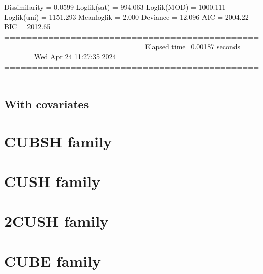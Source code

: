 \documentclass[letterpaper,10pt,english]{sphinxmanual}
\begin{document}
\begin{sphinxVerbatim}[commandchars=\\\{\}]
Dissimilarity = 0.0599
Loglik(sat)   = \PYGZhy{}994.063
Loglik(MOD)   = \PYGZhy{}1000.111
Loglik(uni)   = \PYGZhy{}1151.293
Mean\PYGZhy{}loglik   = \PYGZhy{}2.000
Deviance      = 12.096
\PYGZhy{}\PYGZhy{}\PYGZhy{}\PYGZhy{}\PYGZhy{}\PYGZhy{}\PYGZhy{}\PYGZhy{}\PYGZhy{}\PYGZhy{}\PYGZhy{}\PYGZhy{}\PYGZhy{}\PYGZhy{}\PYGZhy{}\PYGZhy{}\PYGZhy{}\PYGZhy{}\PYGZhy{}\PYGZhy{}\PYGZhy{}\PYGZhy{}\PYGZhy{}\PYGZhy{}\PYGZhy{}\PYGZhy{}\PYGZhy{}\PYGZhy{}\PYGZhy{}\PYGZhy{}\PYGZhy{}\PYGZhy{}\PYGZhy{}\PYGZhy{}\PYGZhy{}\PYGZhy{}\PYGZhy{}\PYGZhy{}\PYGZhy{}\PYGZhy{}\PYGZhy{}\PYGZhy{}\PYGZhy{}\PYGZhy{}\PYGZhy{}\PYGZhy{}\PYGZhy{}\PYGZhy{}\PYGZhy{}\PYGZhy{}\PYGZhy{}\PYGZhy{}\PYGZhy{}\PYGZhy{}\PYGZhy{}\PYGZhy{}\PYGZhy{}\PYGZhy{}\PYGZhy{}\PYGZhy{}\PYGZhy{}\PYGZhy{}\PYGZhy{}\PYGZhy{}\PYGZhy{}\PYGZhy{}\PYGZhy{}\PYGZhy{}\PYGZhy{}\PYGZhy{}\PYGZhy{}
AIC = 2004.22
BIC = 2012.65
=======================================================================
Elapsed time=0.00187 seconds =====\PYGZgt{}\PYGZgt{}\PYGZgt{} Wed Apr 24 11:27:35 2024
=======================================================================
\end{sphinxVerbatim}

\noindent{}


\subsection{With covariates}
\label{\detokenize{manual:with-covariates}}

\section{CUBSH family}
\label{\detokenize{manual:cubsh-family}}

\section{CUSH family}
\label{\detokenize{manual:cush-family}}

\section{2\sphinxhyphen{}CUSH family}
\label{\detokenize{manual:id1}}

\section{CUBE family}
\label{\detokenize{manual:cube-family}}
\end{document}
